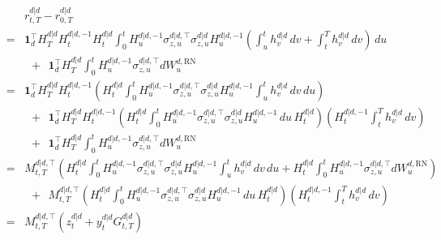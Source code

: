 \documentclass[11pt,english]{amsart}
\newcommand{\vun}{\mathbf{1}}
\newcommand{\RN}{\mathrm{RN}}
\theoremstyle{definition}
\begin{document}
\begin{eqnarray*}
  & & r^{d|d}_{t,T}  - r^{d|d}_{0,T}  \\
  &=& \vun_d^\top H^{d|d}_{T}H^{d|d,-1}_{t} H^{d|d}_{t} \int_0^t  H^{d|d,-1}_{u}\sigma^{d|d,\top}_{z,u} \sigma^{d|d}_{z,u} H^{d|d,-1}_{u} \left(\int_u^t   h^{d|d}_{v} \, dv + \int_t^T   h^{d|d}_{v} \, dv \right) \, du \\
  & &   ~~ + ~~ \vun_d^{\top} H^{d|d}_{T}   \int_0^t   H^{d|d,-1}_{u} \sigma^{d|d,\top}_{z,u}  dW^{d,\RN}_u   \\
  &=& \vun_d^\top H^{d|d}_{T}H^{d|d,-1}_{t} \left(  H^{d|d}_{t} \int_0^t  H^{d|d,-1}_{u}\sigma^{d|d,\top}_{z,u} \sigma^{d|d}_{z,u} H^{d|d,-1}_{u} \int_u^t   h^{d|d}_{v} \, dv  \, du \right) \\
  & &  ~~ + ~~ \vun_d^\top H^{d|d}_{T}H^{d|d,-1}_{t} \left( H^{d|d}_{t} \int_0^t  H^{d|d,-1}_{u}\sigma^{d|d,\top}_{z,u} \sigma^{d|d}_{z,u} H^{d|d,-1}_{u}   \, du \, H^{d|d}_{t}\right) \left( H^{d|d,-1}_{t}  \int_t^T   h^{d|d}_{v} \, dv  \right) \\
  & &   ~~ + ~~ \vun_d^{\top} H^{d|d}_{T}   \int_0^t   H^{d|d,-1}_{u} \sigma^{d|d,\top}_{z,u}  dW^{d,\RN}_u   \\
  &=& M^{d|d,\top}_{t,T} \left(  H^{d|d}_{t} \int_0^t  H^{d|d,-1}_{u}\sigma^{d|d,\top}_{z,u} \sigma^{d|d}_{z,u} H^{d|d,-1}_{u} \int_u^t   h^{d|d}_{v} \, dv  \, du + H^{d|d}_{t} \int_0^t   H^{d|d,-1}_{u} \sigma^{d|d,\top}_{z,u}  dW^{d,\RN}_u \right) \\
  & &  ~~ + ~~ M^{d|d,\top}_{t,T} \left( H^{d|d}_{t} \int_0^t  H^{d|d,-1}_{u}\sigma^{d|d,\top}_{z,u} \sigma^{d|d}_{z,u} H^{d|d,-1}_{u}   \, du \, H^{d|d}_{t}\right) \left( H^{d|d,-1}_{t}  \int_t^T   h^{d|d}_{v} \, dv  \right) \\
  &=& M^{d|d,\top}_{t,T} \left( z^{d|d}_{t}  +  y^{d|d}_t G^{d|d}_{t,T}  \right)
\end{eqnarray*}


\end{document}
